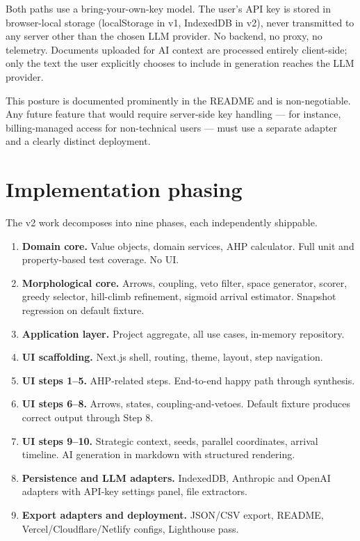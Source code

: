 \documentclass[11pt,a4paper]{article}
\begin{document}
Both paths use a bring-your-own-key model. The user's API key is stored in browser-local storage (localStorage in v1, IndexedDB in v2), never transmitted to any server other than the chosen LLM provider. No backend, no proxy, no telemetry. Documents uploaded for AI context are processed entirely client-side; only the text the user explicitly chooses to include in generation reaches the LLM provider.

This posture is documented prominently in the README and is non-negotiable. Any future feature that would require server-side key handling — for instance, billing-managed access for non-technical users — must use a separate adapter and a clearly distinct deployment.

\section{Implementation phasing}

The v2 work decomposes into nine phases, each independently shippable.

\begin{enumerate}[leftmargin=*]
  \item \textbf{Domain core.} Value objects, domain services, AHP calculator. Full unit and property-based test coverage. No UI.
  \item \textbf{Morphological core.} Arrows, coupling, veto filter, space generator, scorer, greedy selector, hill-climb refinement, sigmoid arrival estimator. Snapshot regression on default fixture.
  \item \textbf{Application layer.} Project aggregate, all use cases, in-memory repository.
  \item \textbf{UI scaffolding.} Next.js shell, routing, theme, layout, step navigation.
  \item \textbf{UI steps 1--5.} AHP-related steps. End-to-end happy path through synthesis.
  \item \textbf{UI steps 6--8.} Arrows, states, coupling-and-vetoes. Default fixture produces correct output through Step 8.
  \item \textbf{UI steps 9--10.} Strategic context, seeds, parallel coordinates, arrival timeline. AI generation in markdown with structured rendering.
  \item \textbf{Persistence and LLM adapters.} IndexedDB, Anthropic and OpenAI adapters with API-key settings panel, file extractors.
  \item \textbf{Export adapters and deployment.} JSON/CSV export, README, Vercel/Cloudflare/Netlify configs, Lighthouse pass.
\end{enumerate}
\end{document}
